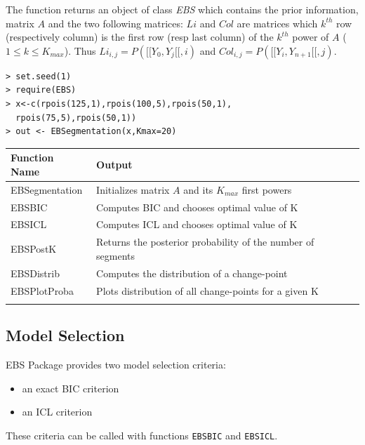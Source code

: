 \documentclass{bioinfo}
\begin{document}
\begin{methods}
The function returns an object of class \textit{EBS} which contains the prior information, matrix $A$ and the two following matrices: $Li$ and $Col$ are matrices which $k^{th}$ row (respectively column) is the first row (resp last column) of the $k^{th}$ power of $A$ ($1\leq k \leq K_{max}$). Thus $Li_{i,j}=P([\![Y_0,Y_j[\![,i)$ and $Col_{i,j}=P([\![Y_i,Y_{n+1}[\![,j)$.

\begin{verbatim}
> set.seed(1)
> require(EBS)
> x<-c(rpois(125,1),rpois(100,5),rpois(50,1),
  rpois(75,5),rpois(50,1))
> out <- EBSegmentation(x,Kmax=20)
\end{verbatim}


\begin{table}[!t]
{\begin{tabular}{ll}\toprule
Function Name & Output \\\midrule
 EBSegmentation & Initializes matrix $A$ and its $K_{max}$ first powers\\
 EBSBIC & Computes BIC and chooses optimal value of K \\
 EBSICL & Computes ICL and chooses optimal value of K \\
 EBSPostK & Returns the posterior probability of the number of segments\\
 EBSDistrib & Computes the distribution of a change-point\\
 EBSPlotProba & Plots distribution of all change-points for a given K\\\botrule
\end{tabular}}{}
\end{table}




\subsection{Model Selection}

EBS Package provides two model selection criteria:
\begin{itemize}
\item an exact BIC criterion
\item an ICL criterion
\end{itemize}


These criteria can be called with functions \texttt{EBSBIC} and \texttt{EBSICL}. 


\end{methods}
\end{document}
